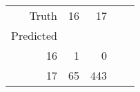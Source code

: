 \begin{tabular}{rrrrr}
\toprule
Truth & 16 & 17 \\
Predicted &  &  \\
\midrule
16 & 1 & 0 \\
17 & 65 & 443 \\
\bottomrule
\end{tabular}
